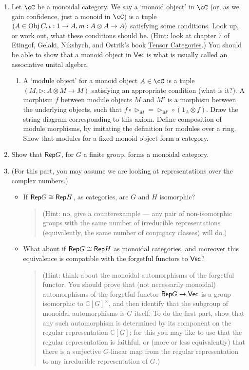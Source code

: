 \documentclass[12pt]{amsart}
\begin{document}
\begin{enumerate}
\item Let $\cC$ be a monoidal category. We say a `monoid object' in $\cC$ (or, as we gain confidence, just a monoid in $\cC$) is a tuple $(A \in \Obj C, \iota: 1 \to A, m: A \otimes A \to A)$ satisfying some conditions. Look up, or work out, what these conditions should be. (Hint: look at chapter 7 of Etingof, Gelaki, Nikshych, and Ostrik's book \href{http://www-math.mit.edu/~etingof/egnobookfinal.pdf}{Tensor Categories}.) You should be able to show that a monoid object in $\mathsf{Vec}$ is what is usually called an associative unital algebra.
\begin{enumerate}
\item A `module object' for a monoid object $A \in \cC$ is a tuple $(M, \triangleright: A \otimes M \to M)$ satisfying an appropriate condition (what is it?). A morphism $f$ between module objects $M$ and $M'$ is a morphism between the underlying objects, such that $f \circ \triangleright_M = \triangleright_{M'} \circ (1_A \otimes f)$. Draw the string diagram corresponding to this axiom. Define composition of module morphisms, by imitating the definition for modules over a ring. Show that modules for a fixed monoid object form a category.
\end{enumerate}
\item Show that $\Rep G$, for $G$ a finite group, forms a monoidal category.
\item (For this part, you may assume we are looking at representations over the complex numbers.)
\begin{itemize}
\item If $\Rep G \cong \Rep H$, as categories, are $G$ and $H$ isomorphic?
\begin{quote}
(Hint: no, give a counterexample --- any pair of non-isomorphic groups with the same number of irreducible representations (equivalently, the same number of conjugacy classes) will do.)
\end{quote}
\item
What about if $\Rep G \cong \Rep H$ as monoidal categories, and moreover this equivalence is compatible with the forgetful functors to $\Vec$?
\begin{quote}
(Hint: think about the monoidal automorphisms of the forgetful functor. You should prove that (not necessarily monoidal) automorphisms of the forgetful functor $\Rep G \to \Vec$ is a group isomorphic to $\mathbb C[G]^{\times}$, and then identify that the subgroup of monoidal automorphisms is $G$ itself. To do the first part, show that any such automorphism is determined by its component on the regular representation $\mathbb C[G]$; for this you may like to use that the regular representation is faithful, or (more or less equivalently) that there is a surjective $G$-linear map from the regular representation to any irreducible representation of $G$.)
\end{quote}
\end{itemize}
\end{enumerate}
\end{document}
